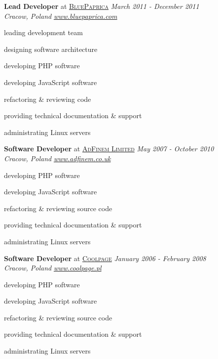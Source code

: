 \documentclass[10pt]{article}
\newenvironment{innerlist}[1][\enskip\textbullet]%
        {\begin{compactitem}[#1]}{\end{compactitem}}
\begin{document}
\vspace{0.30in}

\textbf{Lead Developer} at \href{http://www.bluepaprica.com/}{\textsc{BluePaprica}} 
\hfill \textit{March 2011 - December 2011} \\
\textit{Cracow, Poland} 
\hfill \href{http://www.bluepaprica.com/}{\textit{www.bluepaprica.com}} 
\vspace{0.1in}
\begin{innerlist}
\item leading development team
\item designing software architecture
\item developing PHP software
\item developing JavaScript software
\item refactoring \& reviewing code
\item providing technical documentation \& support
\item administrating Linux servers
\end{innerlist}

\vspace{0.30in}

\textbf{Software Developer} at \href{http://www.adfinem.co.uk/}{\textsc{AdFinem Limited}} 
\hfill \textit{May 2007 - October 2010} \\
\textit{Cracow, Poland} 
\hfill \href{http://www.adfinem.co.uk/}{\textit{www.adfinem.co.uk}} 
\vspace{0.1in}
\begin{innerlist}
\item developing PHP software
\item developing JavaScript software
\item refactoring \& reviewing source code
\item providing technical documentation \& support
\item administrating Linux servers
\end{innerlist}

\vspace{0.30in}

\textbf{Software Developer} at \href{http://www.coolpage.pl/}{\textsc{Coolpage}}
\hfill \textit{January 2006 - February 2008} \\
\textit{Cracow, Poland} 
\hfill \href{http://www.coolpage.pl/}{\textit{www.coolpage.pl}} 
\vspace{0.1in}
\begin{innerlist}
\item developing PHP software
\item developing JavaScript software
\item refactoring \& reviewing source code
\item providing technical documentation \& support
\item administrating Linux servers
\end{innerlist}
\end{document}
